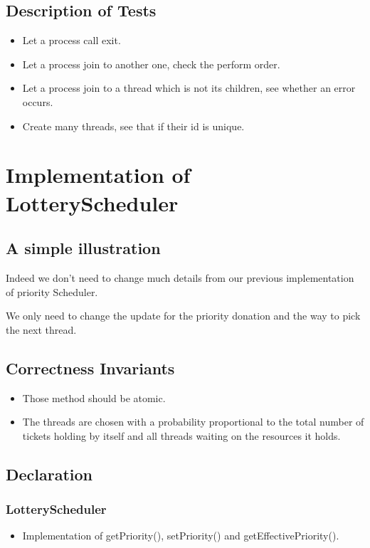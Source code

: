 \documentclass{article}
\begin{document}
	\subsection{Description of Tests}
	\begin{itemize}
		\item Let a process call exit.
		\item Let a process join to another one, check the perform order.
		\item Let a process join to a thread which is not its children, see whether an error occurs.
		\item Create many threads, see that if their id is unique.
	\end{itemize}
	\section{Implementation of LotteryScheduler}
	\subsection{A simple illustration}
	Indeed we don't need to change much details from our previous implementation of priority Scheduler.
	
	We only need to change the update for the priority donation and the way to pick the next thread.
	
	\subsection{Correctness Invariants}
	\begin{itemize}
		\item Those method should be atomic.
		\item The threads are chosen with a probability proportional to the total number of tickets holding by itself and all threads waiting on the resources it holds.
	\end{itemize}
	
	\subsection{Declaration}
	\subsubsection{LotteryScheduler}
	
	\begin{itemize}
		\item Implementation of getPriority(), setPriority() and getEffectivePriority().
	\end{itemize}
	
\end{document}
